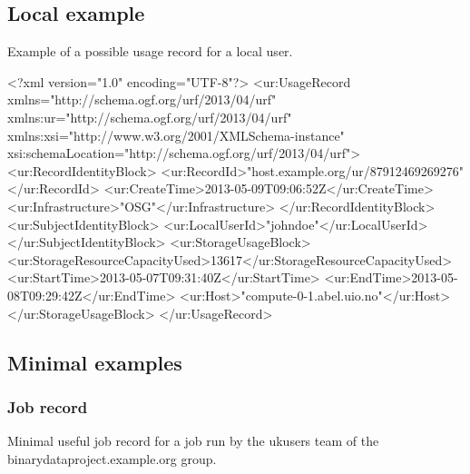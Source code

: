 \subsection{Local example}
Example of a possible usage record for a local user.

\begin{XMLexample}
<?xml version="1.0" encoding="UTF-8"?>
<ur:UsageRecord xmlns="http://schema.ogf.org/urf/2013/04/urf"
    xmlns:ur="http://schema.ogf.org/urf/2013/04/urf"
    xmlns:xsi="http://www.w3.org/2001/XMLSchema-instance"
    xsi:schemaLocation="http://schema.ogf.org/urf/2013/04/urf">
    <ur:RecordIdentityBlock>
        <ur:RecordId>"host.example.org/ur/87912469269276"</ur:RecordId>
        <ur:CreateTime>2013-05-09T09:06:52Z</ur:CreateTime>
        <ur:Infrastructure>"OSG"</ur:Infrastructure>
    </ur:RecordIdentityBlock>
    <ur:SubjectIdentityBlock>
        <ur:LocalUserId>"johndoe"</ur:LocalUserId>
    </ur:SubjectIdentityBlock>
    <ur:StorageUsageBlock>
        <ur:StorageResourceCapacityUsed>13617</ur:StorageResourceCapacityUsed>
        <ur:StartTime>2013-05-07T09:31:40Z</ur:StartTime>
        <ur:EndTime>2013-05-08T09:29:42Z</ur:EndTime>
        <ur:Host>"compute-0-1.abel.uio.no"</ur:Host>
    </ur:StorageUsageBlock>
</ur:UsageRecord>
\end{XMLexample}

\subsection{Minimal examples}

\subsubsection{Job record}
Minimal useful job record for a job run by the ukusers team of the binarydataproject.example.org group.

